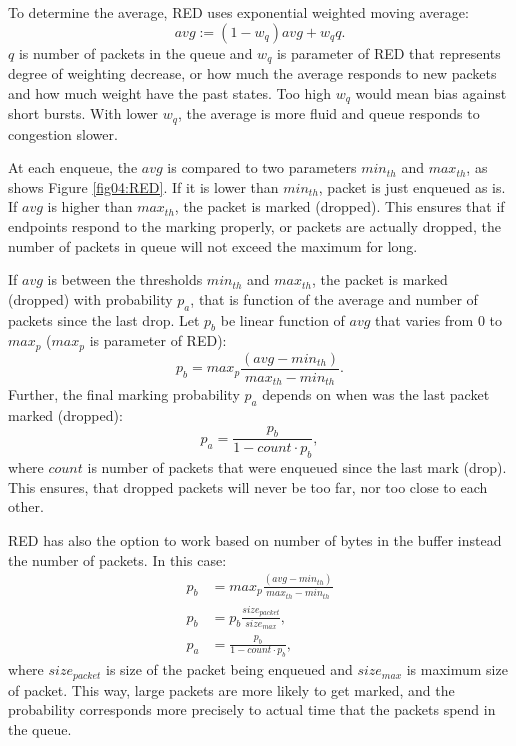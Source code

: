 To determine the average, RED uses exponential weighted moving average:
\[
avg := (1 - w_q)avg+w_qq.
\]
$q$ is number of packets in the queue and $w_q$ is parameter of RED that represents degree of weighting decrease, or how much the average responds to new packets and how much weight have the past states. Too high $w_q$ would mean bias against short bursts. With lower $w_q$, the average is more fluid and queue responds to congestion slower.

At each enqueue, the $avg$ is compared to two parameters $min_{th}$ and $max_{th}$, as shows Figure \ref{fig04:RED}. If it is lower than $min_{th}$, packet is just enqueued as is. If $avg$ is higher than $max_{th}$, the packet is marked (dropped). This ensures that if endpoints respond to the marking properly, or packets are actually dropped, the number of packets in queue will not exceed the maximum for long.

If $avg$ is between the thresholds $min_{th}$ and $max_{th}$, the packet is marked (dropped) with probability $p_a$, that is function of the average and number of packets since the last drop. Let $p_b$ be linear function of $avg$ that varies from 0 to $max_p$ ($max_p$ is parameter of RED):
\[
  p_b = max_p \frac{(avg - min_{th})}{max_{th} - min_{th}}.
\]
Further, the final marking probability $p_a$ depends on when was the last packet marked (dropped):
\[
p_a = \frac{p_b}{1-count \cdot p_b},
\]
where $count$ is number of packets that were enqueued since the last mark (drop). This ensures, that dropped packets will never be too far, nor too close to each other\cite[Section 7]{Floyd:1993:RED:169931.169935}.

RED has also the option to work based on number of bytes in the buffer instead the number of packets. In this case:
\begin{align*}
p_b &= max_p \frac{(avg - min_{th})}{max_{th} - min_{th}}\\
p_b &= p_b \frac{size_{packet}}{size_{max}},\\
p_a &= \frac{p_b}{1-count \cdot p_b},
\end{align*}
where $size_{packet}$ is size of the packet being enqueued and $size_{max}$ is maximum size of packet. This way, large packets are more likely to get marked, and the probability corresponds more precisely to actual time that the packets spend in the queue.

